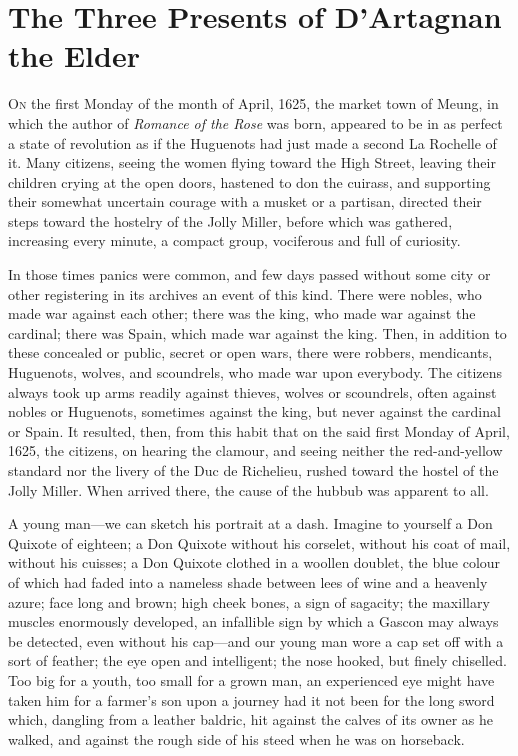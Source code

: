
\chapter{The Three Presents of D'Artagnan the Elder}

\lettrine[]{O}{n} the first Monday of the month of April, 1625, the market town of Meung, in which the author of \textit{Romance of the Rose} was born, appeared to be in as perfect a state of revolution as if the Huguenots had just made a second La Rochelle of it. Many citizens, seeing the women flying toward the High Street, leaving their children crying at the open doors, hastened to don the cuirass, and supporting their somewhat uncertain courage with a musket or a partisan, directed their steps toward the hostelry of the Jolly Miller, before which was gathered, increasing every minute, a compact group, vociferous and full of curiosity. 

In those times panics were common, and few days passed without some city or other registering in its archives an event of this kind. There were nobles, who made war against each other; there was the king, who made war against the cardinal; there was Spain, which made war against the king. Then, in addition to these concealed or public, secret or open wars, there were robbers, mendicants, Huguenots, wolves, and scoundrels, who made war upon everybody. The citizens always took up arms readily against thieves, wolves or scoundrels, often against nobles or Huguenots, sometimes against the king, but never against the cardinal or Spain. It resulted, then, from this habit that on the said first Monday of April, 1625, the citizens, on hearing the clamour, and seeing neither the red-and-yellow standard nor the livery of the Duc de Richelieu, rushed toward the hostel of the Jolly Miller. When arrived there, the cause of the hubbub was apparent to all. 

A young man---we can sketch his portrait at a dash. Imagine to yourself a Don Quixote of eighteen; a Don Quixote without his corselet, without his coat of mail, without his cuisses; a Don Quixote clothed in a woollen doublet, the blue colour of which had faded into a nameless shade between lees of wine and a heavenly azure; face long and brown; high cheek bones, a sign of sagacity; the maxillary muscles enormously developed, an infallible sign by which a Gascon may always be detected, even without his cap---and our young man wore a cap set off with a sort of feather; the eye open and intelligent; the nose hooked, but finely chiselled. Too big for a youth, too small for a grown man, an experienced eye might have taken him for a farmer's son upon a journey had it not been for the long sword which, dangling from a leather baldric, hit against the calves of its owner as he walked, and against the rough side of his steed when he was on horseback. 

